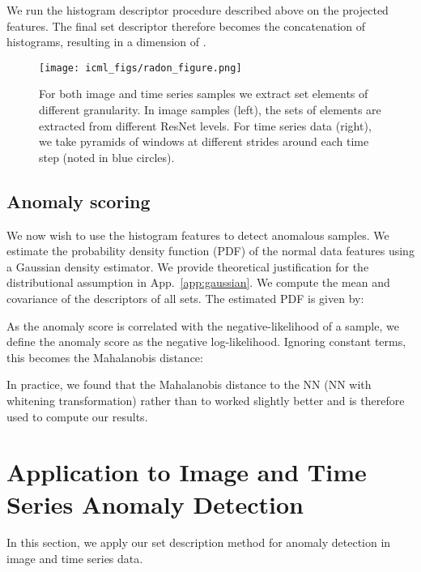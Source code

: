 \documentclass{article}
\begin{document}
We run the histogram descriptor procedure described above on the projected features. The final set descriptor  therefore becomes the concatenation of  histograms, resulting in a dimension of .





\begin{figure*}
  \centering
  \texttt{[image: icml\_figs/radon\_figure.png]}

  \caption{ For both image and time series samples we extract set elements of different granularity. In image samples (left), the sets of elements are extracted from different ResNet levels. For time series data (right), we take pyramids of windows at different strides around each time step (noted in blue circles).}
  \label{fig:elemnts}
  \vspace{5pt}
\end{figure*}


\subsection{Anomaly scoring}
\label{sec:anomaly_scoring}
We now wish to use the histogram features  to detect anomalous samples. We estimate the probability density function (PDF) of the normal data features  using a Gaussian density estimator. We provide theoretical justification for the distributional assumption in App.~\ref{app:gaussian}.  We compute the mean  and covariance  of the descriptors of all sets. The estimated PDF is given by:


As the anomaly score is correlated with the negative-likelihood of a sample, we define the anomaly score  as the negative log-likelihood. Ignoring constant terms, this becomes the Mahalanobis distance:



In practice, we found that the Mahalanobis distance to the NN (NN with whitening transformation) rather than to  worked slightly better and is therefore used to compute our results.







\section{Application to Image and Time Series Anomaly Detection}
\label{sec:applications}


In this section, we apply our set description method for anomaly detection in image and time series data. 
\end{document}
